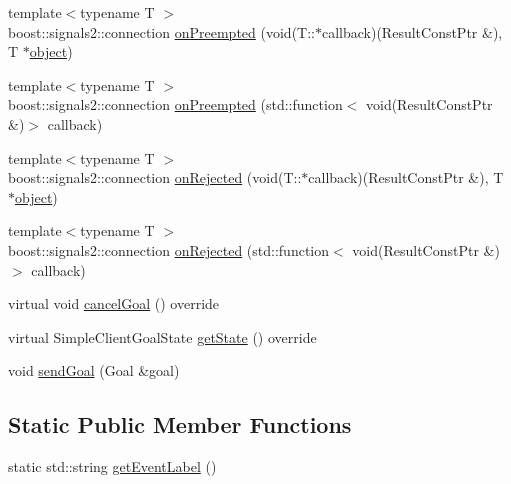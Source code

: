 \begin{DoxyCompactItemize}
\item 
{\footnotesize template$<$typename T $>$ }\\boost\+::signals2\+::connection \hyperlink{classsmacc_1_1SmaccActionClientBase_a66aa6f2ae9772ab724d0944f06f85f05}{on\+Preempted} (void(T\+::$\ast$callback)(Result\+Const\+Ptr \&), T $\ast$\hyperlink{classobject}{object})
\item 
{\footnotesize template$<$typename T $>$ }\\boost\+::signals2\+::connection \hyperlink{classsmacc_1_1SmaccActionClientBase_a5b2025b38140cbfe473a1605ad3531f8}{on\+Preempted} (std\+::function$<$ void(Result\+Const\+Ptr \&)$>$ callback)
\item 
{\footnotesize template$<$typename T $>$ }\\boost\+::signals2\+::connection \hyperlink{classsmacc_1_1SmaccActionClientBase_a68c63078788107776b0a4a280f7580a6}{on\+Rejected} (void(T\+::$\ast$callback)(Result\+Const\+Ptr \&), T $\ast$\hyperlink{classobject}{object})
\item 
{\footnotesize template$<$typename T $>$ }\\boost\+::signals2\+::connection \hyperlink{classsmacc_1_1SmaccActionClientBase_a6c2f7d85c0e60285af9af52a7f79fe24}{on\+Rejected} (std\+::function$<$ void(Result\+Const\+Ptr \&)$>$ callback)
\item 
virtual void \hyperlink{classsmacc_1_1SmaccActionClientBase_a65a485ac208c3b3cd85b40a7d88989ec}{cancel\+Goal} () override
\item 
virtual Simple\+Client\+Goal\+State \hyperlink{classsmacc_1_1SmaccActionClientBase_a7a3edf84a8126dc723f3fc5e082aecf0}{get\+State} () override
\item 
void \hyperlink{classsmacc_1_1SmaccActionClientBase_a58c67a87c5fb8ea1633573c58fe3eee1}{send\+Goal} (Goal \&goal)
\end{DoxyCompactItemize}
\subsection*{Static Public Member Functions}
\begin{DoxyCompactItemize}
\item 
static std\+::string \hyperlink{classsmacc_1_1SmaccActionClientBase_a9c0a371fece7b434555eedb88a19455e}{get\+Event\+Label} ()
\end{DoxyCompactItemize}
